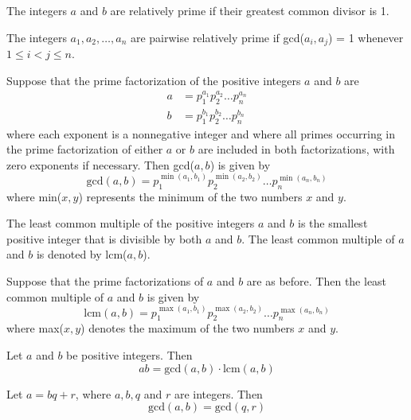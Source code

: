 \documentclass[12pt]{article}
\begin{document}
\begin{definition} The integers $a$ and $b$ are relatively prime if their greatest common divisor is 1. \end{definition}
\begin{definition} The integers $a_1, a_2, \dots, a_n$ are pairwise relatively prime if gcd($a_i, a_j$) = 1 whenever $1 \leq i < j \leq n$. \end{definition} 
Suppose that the prime factorization of the positive integers $a$ and $b$ are $$\begin{aligned} a &= p_1^{a_1}p_2^{a_2}\dots p_n^{a_n} \\ b &= p_1^{b_1}p_2^{b_2}\dots p_n^{b_n} \end{aligned} $$ where each exponent is a nonnegative integer and where all primes occurring in the prime factorization of either $a$ or $b$ are included in both factorizations, with zero exponents if necessary. Then gcd($a, b$) is given by $$\text{gcd}(a, b) = p_1^{\min(a_1, b_1)}p_2^{\min(a_2, b_2)}\dots p_n^{\min(a_n, b_n)} $$ where min($x, y$) represents the minimum of the two numbers $x$ and $y$. 
\begin{definition} The least common multiple of the positive integers $a$ and $b$ is the smallest positive integer that is divisible by both $a$ and $b$. The least common multiple of $a$ and $b$ is denoted by lcm($a, b$). \end{definition} 
Suppose that the prime factorizations of $a$ and $b$ are as before. Then the least common multiple of $a$ and $b$ is given by $$\text{lcm}(a, b) = p_1^{\max(a_1, b_1)}p_2^{\max(a_2, b_2)}\dots p_n^{\max(a_n, b_n)} $$ where max($x, y$) denotes the maximum of the two numbers $x$ and $y$. 
\begin{theorem} Let $a$ and $b$ be positive integers. Then $$ab = \text{gcd}(a, b) \cdot \text{lcm}(a, b) $$ \end{theorem} 
\begin{theorem} Let $a = bq + r$, where $a, b, q$ and $r$ are integers. Then $$\text{gcd}(a, b) = \text{gcd}(q, r) $$ \end{theorem} 
\end{document}
